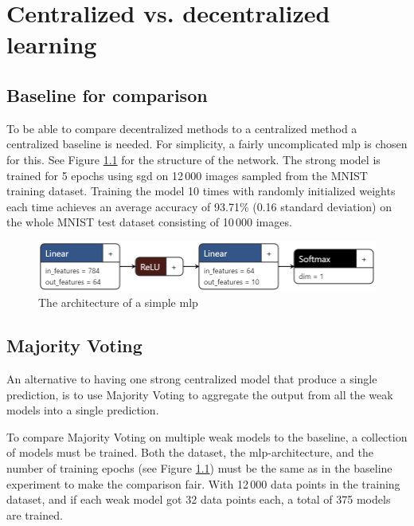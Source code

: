 \chapter{Centralized vs. decentralized learning}
\label{chap:general-dezai}

\section{Baseline for comparison}

To be able to compare decentralized methods to a centralized method a centralized baseline is needed. For simplicity, a fairly uncomplicated \acrfull{mlp} is chosen for this. See Figure \ref{fig:centralized-mlp} for the structure of the network. The strong model is trained for 5 epochs using \acrshort{sgd} on 12\,000 images sampled from the MNIST training dataset. Training the model 10 times with randomly initialized weights each time achieves an average accuracy of 93.71\% (0.16  standard deviation) on the whole MNIST test dataset consisting of 10\,000 images.


\begin{figure}
    \centering
    \includegraphics[width=\textwidth]{figures/simple-mlp.png}
    \caption{The architecture of a simple \acrshort{mlp}}
    \label{fig:centralized-mlp}
\end{figure} 

\section{Majority Voting}
\label{sec:mv-experiment}


An alternative to having one strong centralized model that produce a single prediction, is to use Majority Voting to aggregate the output from all the weak models into a single prediction.

To compare Majority Voting on multiple weak models to the baseline, a collection of models must be trained. Both the dataset, the \acrshort{mlp}-architecture, and the number of training epochs (see Figure \ref{fig:centralized-mlp}) must be the same as in the baseline experiment to make the comparison fair. With 12\,000 data points in the training dataset, and if each weak model got 32 data points each, a total of 375 models are trained.

